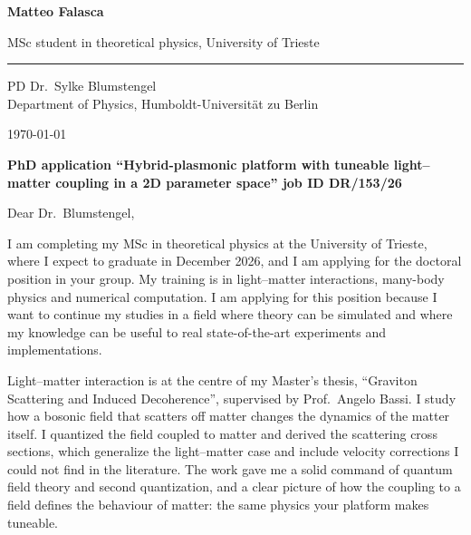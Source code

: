 \documentclass[11pt,a4paper]{article}
\begin{document}
{\LARGE\bfseries Matteo Falasca}\par\vspace{-2pt}
{\small\color{muted}MSc student in theoretical physics, University of Trieste\par\vspace{-5pt}}
\vspace{-6pt}\noindent\rule{\linewidth}{0.3pt}\par

\vspace{3pt}
{\small
\begin{minipage}[t]{0.68\linewidth}
PD Dr.\ Sylke Blumstengel\\
Department of Physics, Humboldt-Universität zu Berlin
\end{minipage}\hfill
\begin{minipage}[t]{0.3\linewidth}\raggedleft\color{muted}
\today
\end{minipage}}

\vspace{5pt}
\textbf{PhD application ``Hybrid-plasmonic platform with tuneable light--matter coupling in a 2D parameter space'' job ID DR/153/26 }

Dear Dr.\ Blumstengel,

I am completing my MSc in theoretical physics at the University of Trieste,
where I expect to graduate in December 2026, and I am applying
for the doctoral position in your group. My training is in
light--matter interactions, many-body physics and
numerical computation.
I am applying for this position because I want
to continue my studies in a field
where theory can be simulated and where my knowledge
can be useful to real
state-of-the-art experiments and implementations.

Light--matter interaction is at the centre of my
Master's thesis, ``Graviton Scattering and Induced Decoherence'',
supervised by Prof.\ Angelo Bassi. I study how a bosonic field that
scatters off matter changes the dynamics of the matter itself. I
quantized the field coupled to matter and derived the scattering
cross sections, which generalize the light--matter case and include
velocity corrections I could not find in the literature. The work
gave me a solid command of quantum field theory and second
quantization, and a clear picture of how the coupling to a
field defines the behaviour of matter: the same physics
your platform makes tuneable.
\end{document}
